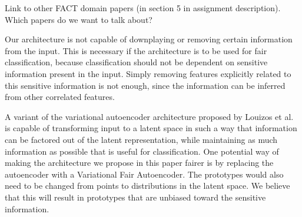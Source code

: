 Link to other FACT domain papers (in section 5 in assignment description). Which papers do we want to talk about?

Our architecture is not capable of downplaying or removing certain
information from the input. This is necessary if the architecture is to be used for fair classification, because classification should not be dependent on sensitive information present in the input. Simply removing features explicitly related to this sensitive information is not enough, since the information can be inferred from other correlated features.

A variant of the variational autoencoder architecture \citep{vae} proposed by Louizos et al. \citep{vfae} is capable of transforming input to a latent space in such a way that information can be factored out of the latent representation, while maintaining as much information as possible that is useful for classification. One potential way of making the architecture we propose in this paper fairer is by replacing the autoencoder with a Variational Fair Autoencoder. The prototypes would also need to be changed from points to distributions in the latent space. We believe that this will result in prototypes that are unbiased toward the sensitive information.